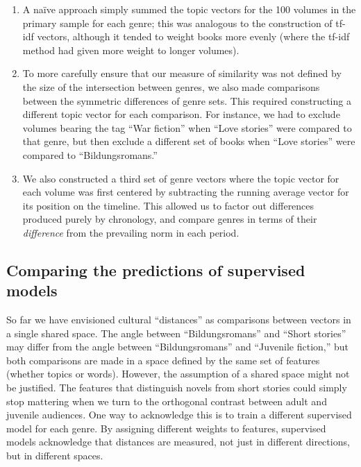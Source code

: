 \documentclass[11pt]{article}
\begin{document}
\begin{enumerate}

\item A na\"ive approach simply summed the topic vectors for the 100 volumes in the primary sample for each genre; this was analogous to the construction of tf-idf vectors, although it tended to weight books more evenly (where the tf-idf method had given more weight to longer volumes).

\item To more carefully ensure that our measure of similarity was not defined by the size of the intersection between genres, we also made comparisons between the symmetric differences of genre sets. This required constructing a different topic vector for each comparison. For instance, we had to exclude volumes bearing the tag ``War fiction'' when ``Love stories'' were compared to that genre, but then exclude a different set of books when ``Love stories'' were compared to ``Bildungsromans.''

\item We also constructed a third set of genre vectors where the topic vector for each volume was first centered by subtracting the running average vector for its position on the timeline. This allowed us to factor out differences produced purely by chronology, and compare genres in terms of their \textit{difference} from the prevailing norm in each period.

\end{enumerate}

\subsection{Comparing the predictions of supervised models}

So far we have envisioned cultural ``distances'' as comparisons between vectors in a single shared space. The angle between ``Bildungsromans'' and ``Short stories'' may differ from the angle between ``Bildungsromans'' and ``Juvenile fiction,'' but both comparisons are made in a space defined by the same set of features (whether topics or words). However, the assumption of a shared space might not be justified. The features that distinguish novels from short stories could simply stop mattering when we turn to the orthogonal contrast between adult and juvenile audiences. One way to acknowledge this is to train a different supervised model for each genre. By assigning different weights to features, supervised models acknowledge that distances are measured, not just in different directions, but in different spaces.
\end{document}
